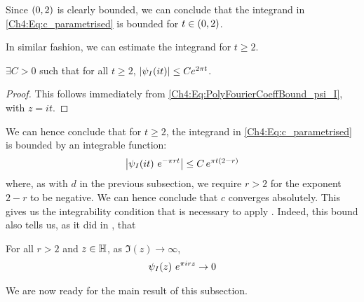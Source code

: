 Since $\left( 0, 2 \right)$ is clearly bounded, we can conclude that the integrand in \eqref{Ch4:Eq:c_parametrised} is bounded for $t \in \left( 0, 2 \right)$.

In similar fashion, we can estimate the integrand for $t \geq 2$.

\begin{boxlemma}
    $\exists C > 0$ such that for all $t \geq 2$, $\left\lvert \psi_I\!\left( it \right) \right\rvert \leq C e^{2 \pi t}$.
\end{boxlemma}
\begin{proof}
    This follows immediately from \eqref{Ch4:Eq:PolyFourierCoeffBound_psi_I}, with $z = it$.
\end{proof}

We can hence conclude that for $t \geq 2$, the integrand in \eqref{Ch4:Eq:c_parametrised} is bounded by an integrable function:
\begin{align*}
    \left\lvert \psi_I\!\left( it \right) \, e^{- \pi r t} \right\rvert \leq C \, e^{\pi t \left( 2 - r \right)}
\end{align*}
where, as with $d$ in the previous subsection, we require $r > 2$ for the exponent $2 - r$ to be negative. We can hence conclude that $c$ converges absolutely. This gives us the integrability condition that is necessary to apply . Indeed, this bound also tells us, as it did in , that
\begin{boxlemma}
    For all $r > 2$ and $z \in \mathbb{H}$, as $\Im(z) \to \infty$,
    \begin{align*}
        \psi_I\!\left( z \right) \, e^{\pi i r z} \to 0
    \end{align*}
\end{boxlemma}

We are now ready for the main result of this subsection.